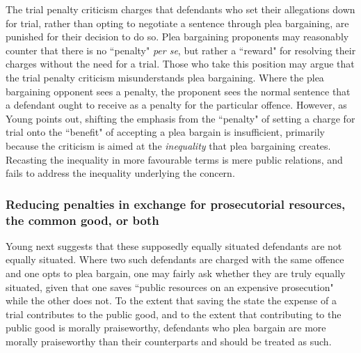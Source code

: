 The trial penalty criticism charges that defendants who set their allegations down for trial, rather than opting to negotiate a sentence through plea bargaining, are punished for their decision to do so. Plea bargaining proponents may reasonably counter that there is no ``penalty" \textit{per se}, but rather a ``reward" for resolving their charges without the need for a trial. Those who take this position may argue that the trial penalty criticism misunderstands plea bargaining. Where the plea bargaining opponent sees a penalty, the proponent sees the normal sentence that a defendant ought to receive as a penalty for the particular offence. However, as Young points out, shifting the emphasis from the ``penalty" of setting a charge for trial onto the ``benefit" of accepting a plea bargain is insufficient, primarily because the criticism is aimed at the \textit{inequality} that plea bargaining creates. Recasting the inequality in more favourable terms is mere public relations, and fails to address the inequality underlying the concern.

\subsubsection{Reducing penalties in exchange for prosecutorial resources, the common good, or both}

Young next suggests that these supposedly equally situated defendants are not equally situated. Where two such defendants are charged with the same offence and one opts to plea bargain, one may fairly ask whether they are truly equally situated, given that one saves ``public resources on an expensive prosecution" while the other does not. To the extent that saving the state the expense of a trial contributes to the public good, and to the extent that contributing to the public good is morally praiseworthy, defendants who plea bargain are more morally praiseworthy than their counterparts and should be treated as such. 

